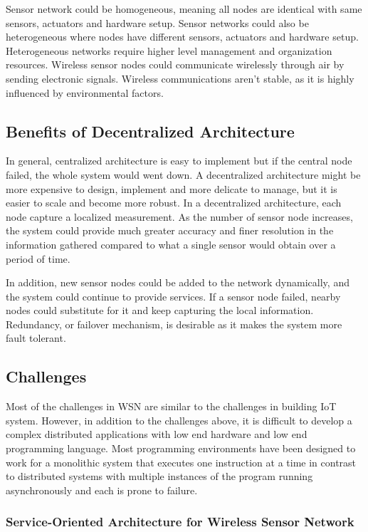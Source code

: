 Sensor network could be homogeneous, meaning all nodes are identical with same
sensors, actuators and hardware setup. Sensor networks could also be
heterogeneous where nodes have different sensors, actuators and hardware setup.
Heterogeneous networks require higher level management and organization
resources. Wireless sensor nodes could communicate wirelessly through air by
sending electronic signals. Wireless communications aren't stable, as it is
highly influenced by environmental factors.

\subsection{Benefits of Decentralized Architecture}

In general, centralized architecture is easy to implement but if the central
node failed, the whole system would went down. A decentralized architecture
might be more expensive to design, implement and more delicate to manage, but it
is easier to scale and become more robust. In a decentralized architecture, each
node capture a localized measurement. As the number of sensor node increases,
     the system could provide much greater accuracy and finer resolution in the
     information gathered compared to what a single sensor would obtain over
     a period of time.

In addition, new sensor nodes could be added to the network dynamically, and
the system could continue to provide services. If a sensor node failed, nearby
nodes could substitute for it and keep capturing the local information.
Redundancy, or failover mechanism, is desirable as it makes the system more
fault tolerant.

\subsection{Challenges}

Most of the challenges in WSN are similar to the challenges in building IoT
system.  However, in addition to the challenges above, it is difficult to
develop a complex distributed applications with low end hardware and low end
programming language. Most programming environments have been designed to work
for a monolithic system that executes one instruction at a time in contrast to
distributed systems with multiple instances of the program running
asynchronously and each is prone to failure.

\subsubsection{Service-Oriented Architecture for Wireless Sensor Network}

